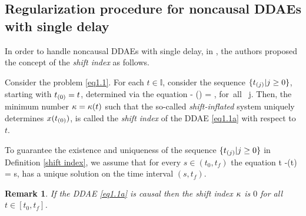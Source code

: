 \documentclass[final,reqno]{siamltex}
\newtheorem{remark}[theorem]{Remark}
\begin{document}
\subsection{Regularization procedure for noncausal DDAEs with single delay}\label{Sec2.2}
In order to handle noncausal DDAEs with single delay, in \cite{HaM14}, the authors proposed the concept of the \emph{shift index} as follows.
%
\begin{definition}\label{shift index}
Consider the problem \eqref{eq1.1}. For each $t\in \mathbb{I}$, consider the sequence $\{t_{(j)}| j\geq 0\}$, starting with $t_{(0)}=t$, 
determined via the equation 
%
\be\label{eq14}
  - \tau() = , \quad \mbox{for all } j.
\ee
%
Then, the minimum number $\kappa = \kappa(t)$ such that the so-called \emph{shift-inflated} system
%
\be\label{eq13}
\ee
%
uniquely determines $x(t_{(0)})$, is called the \emph{shift index} of the DDAE \eqref{eq1.1a} with respect to $t$.
\end{definition}

To guarantee the existence and uniqueness of the sequence $\{t_{(j)}| j\geq 0\}$ in Definition \ref{shift index}, we assume that for every $s \in (t_0,t_f)$ the equation
%
\be\label{shift equation}
 t -\tau(t) = s,
\ee
%
has a unique solution on the time interval $(s,t_f)$. 

\begin{remark}
If the DDAE \eqref{eq1.1a} is causal then the shift index $\kappa$ is $0$ for all $t \in [t_0,t_f]$.
\end{remark}
\end{document}

